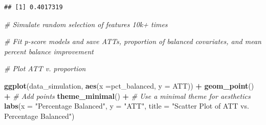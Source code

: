 \documentclass[
]{article}
\newenvironment{Shaded}{\begin{snugshade}}{\end{snugshade}}
\newcommand{\AttributeTok}[1]{\textcolor[rgb]{0.13,0.29,0.53}{#1}}
\newcommand{\CommentTok}[1]{\textcolor[rgb]{0.56,0.35,0.01}{\textit{#1}}}
\newcommand{\ConstantTok}[1]{\textcolor[rgb]{0.56,0.35,0.01}{#1}}
\newcommand{\FunctionTok}[1]{\textcolor[rgb]{0.13,0.29,0.53}{\textbf{#1}}}
\newcommand{\NormalTok}[1]{#1}
\newcommand{\OtherTok}[1]{\textcolor[rgb]{0.56,0.35,0.01}{#1}}
\newcommand{\SpecialCharTok}[1]{\textcolor[rgb]{0.81,0.36,0.00}{\textbf{#1}}}
\newcommand{\StringTok}[1]{\textcolor[rgb]{0.31,0.60,0.02}{#1}}
\begin{document}
\begin{Shaded}
\end{Shaded}

\begin{verbatim}
## [1] 0.4017319
\end{verbatim}

\begin{Shaded}
\begin{Highlighting}[]
\CommentTok{\# Simulate random selection of features 10k+ times}

\CommentTok{\# Fit p{-}score models and save ATTs, proportion of balanced covariates, and mean percent balance improvement}

\CommentTok{\# Plot ATT v. proportion}

\FunctionTok{ggplot}\NormalTok{(data\_simulation, }\FunctionTok{aes}\NormalTok{(}\AttributeTok{x =}\NormalTok{pct\_balanced, }\AttributeTok{y =}\NormalTok{ ATT)) }\SpecialCharTok{+} 
  \FunctionTok{geom\_point}\NormalTok{() }\SpecialCharTok{+}  \CommentTok{\# Add points}
  \FunctionTok{theme\_minimal}\NormalTok{() }\SpecialCharTok{+}  \CommentTok{\# Use a minimal theme for aesthetics}
  \FunctionTok{labs}\NormalTok{(}\AttributeTok{x =} \StringTok{"Percentage Balanced"}\NormalTok{, }\AttributeTok{y =} \StringTok{"ATT"}\NormalTok{, }
       \AttributeTok{title =} \StringTok{"Scatter Plot of ATT vs. Percentage Balanced"}\NormalTok{)}
\end{Highlighting}
\end{Shaded}
\end{document}
